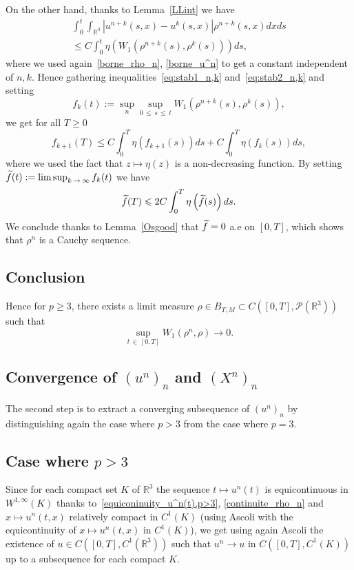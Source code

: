 \documentclass[10pt]{amsart}
\theoremstyle{definition}\newtheorem{defi}[theo]{Definition}\newtheorem{rema}[theo]{Remark}\newtheorem{exam}[theo]{Example}\newtheorem{exem}[theo]{Example}\newtheorem{nota}[theo]{Notation}
\newcommand{\R}{\mathbb{R}}
\newcommand{\clP}{\mathcal{P}}
\renewcommand{\leq}{\leqslant}
\renewcommand{\geq}{\geqslant}
\let\oldtilde\tilde
\renewcommand*{\tilde}[1]{\mathchoice{\widetilde{#1}}{\widetilde{#1}}{\oldtilde{#1}}{\oldtilde{#1}}}
\begin{document}
On the other hand, thanks to Lemma~\ref{LLint} we have
\begin{multline}\label{eq:stab2_n,k}
\int_0^t \int_{\R^3} \left|u^{n+k}(s,x)-u^{k}(s,x)\right|\rho^{n+k}(s,x) dx ds\\
\leq C \int_0^t \eta \left(W_1\left(\rho^{n+k}(s),\rho^{k}(s)\right) \right)ds,
\end{multline}
where we used again~\eqref{borne_rho_n}, \eqref{borne_u^n} to get a constant independent of $n,k$. Hence gathering inequalities~\eqref{eq:stab1_n,k} and~\eqref{eq:stab2_n,k} and setting
\[
f_{k}(t):=\mathop{\sup}_n
\mathop{\sup}_{0\,\leq\,s\,\leq\,t} W_1\left(\rho^{n+k}(s),\rho^{k}(s)\right),
\]
we get for all $T\geq 0$
\[
f_{k+1}(T) \leq C \int_0^T \eta\left(f_{k+1}(s)\right)ds+ C\int_0^T \eta\left(f_k(s)\right) ds,
\]
where we used the fact that $z \mapsto \eta(z)$ is a non-decreasing function. By setting $\tilde{f}(t):={\limsup}_{k\,\to\,\infty}\,f_k(t) $ we have
\[
\tilde{f}(T) \leq 2 C \int_0^T \eta\left(\tilde{f}(s)\right) ds.
\]
We conclude thanks to Lemma~\ref{Osgood} that $\tilde{f}=0 $ a.e on $[0,T]$, which shows that $ \rho^n$ is a Cauchy sequence.


\subsection*{Conclusion}
Hence for $p\geq 3$, there exists a limit measure $\rho \in B_{T,M}\subset C([0,T],\clP(\R^3))$ such that
\[
\underset{t\,\in\,[0,T]}{\sup} W_1(\rho^n,\rho)\to 0.
\]



\subsection{Convergence of \texorpdfstring{$(u^n)_n$}{(un)n} and \texorpdfstring{$(X^n)_n$}{(Xn)n}}

The second step is to extract a converging subsequence of $(u^n)_n$ by distinguishing again the case where $p>3$ from the case where $p=3$.

\subsection*{Case where \texorpdfstring{$p>3$}{p>3}}

Since for each compact set $K$ of $\R^3$ the sequence $ t \mapsto u^n(t)$ is equicontinuous in $W^{1,\infty}(K) $ thanks to~\eqref{equiconinuity_u^n(t),p>3}, \eqref{continuite_rho_n} and $x\mapsto u^n(t,x)$ relatively compact in $ C^1(K) $ (using Ascoli with the equicontinuity of $x\mapsto u^n(t,x)$ in $ C^1(K)$), we get using again Ascoli the existence of $u\in C([0,T], C^1(\R^3))$ such that $u^n \to u $ in $C([0,T], C^1(K))$ up to a subsequence for each compact $K$.
\end{document}
